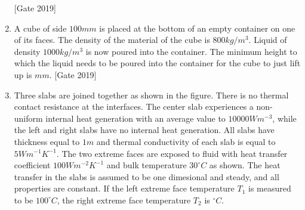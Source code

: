 \documentclass[journal]{IEEEtran}
\begin{document}
\begin{enumerate}
\begin{center}
{\begin{tikzpicture}
\end{tikzpicture}
}
\end{center}\hfill{[Gate 2019]}
	\item A cube of side $100mm$ is placed at the bottom of an empty container on one of its faces. The density of the material of the cube is $800kg/{m^3}$. Liquid of density $1000 kg/{m^3}$ is now poured into the container. The minimum height to which the liquid needs to be poured into the container for the cube to just lift up is \underline{\hspace{2cm}}$mm$. \hfill{[Gate 2019]}
	\item Three slabs are joined together as shown in the figure. There is no thermal contact resistance at the interfaces. The center slab experiences a non-uniform internal heat generation with an average value to $10000 Wm^{-3}$, while the left and right slabs have no internal heat generation. All slabs have thickness equal to $1m$ and thermal conductivity of each slab is equal to$5Wm^{-1}K^{-1}$. The two extreme faces are exposed to fluid with heat transfer coefficient $100Wm^{-2}K^{-1}$ and bulk temperature $30^{\circ}C$ as shown. The heat transfer in the slabs is assumed to be one dimesional and steady, and all properties are constant. If the left extreme face temperature $T_1$ is measured to be $100^{\circ}C$, the right extreme face temperature $T_2$ is \underline{\hspace{2cm}}$^{\circ}C$.
		\begin{figure}[h]
\centering
{}
\end{figure}
\end{enumerate}
\end{document}

